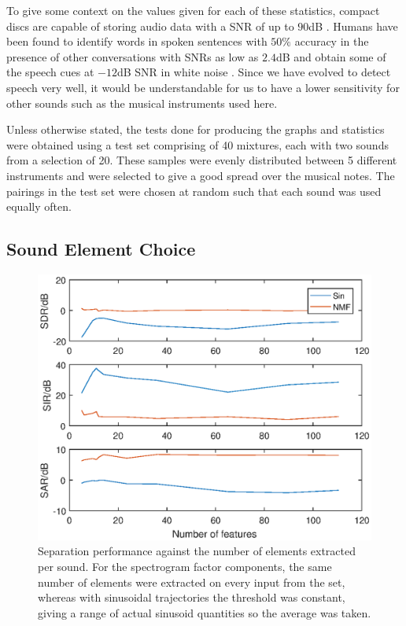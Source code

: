 \documentclass[12pt,a4paper,twoside,openright]{report}
\begin{document}
{\color{red}To give some context on the values given for each of these statistics, compact discs are capable of storing audio data with a SNR of up to $ 90 $dB \cite{fries2005digital}. Humans have been found to identify words in spoken sentences with $ 50\% $ accuracy in the presence of other conversations with SNRs as low as $ 2.4 $dB \cite{killion2004development} and obtain some of the speech cues at $ -12 $dB SNR in white noise \cite{miller1955analysis}. Since we have evolved to detect speech very well, it would be understandable for us to have a lower sensitivity for other sounds such as the musical instruments used here.}

Unless otherwise stated, the tests done for producing the graphs and statistics were obtained using a test set comprising of 40 mixtures, each with two sounds from a selection of 20. These samples were evenly distributed between 5 different instruments and were selected to give a good spread over the musical notes. The pairings in the test set were chosen at random such that each sound was used equally often.

\subsection{Sound Element Choice}


\begin{figure}
\centering
\includegraphics[width=0.7\linewidth]{./FeatureCompPlot}
\caption[Separation performance against the number of elements extracted per sound.]{Separation performance against the number of elements extracted per sound. For the spectrogram factor components, the same number of elements were extracted on every input from the set, whereas with sinusoidal trajectories the threshold was constant, giving a range of actual sinusoid quantities so the average was taken.}
\label{fig:FeatureCompPlot}
\end{figure}
\end{document}
